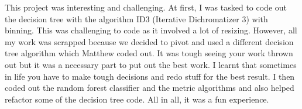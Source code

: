  This project was interesting and challenging. At first, I was tasked to code out the decision tree with the algorithm ID3 (Iterative Dichromatizer 3) with binning. This was challenging to code as it involved a lot of resizing. However, all my work was scrapped because we decided to pivot and used a different decision tree algorithm which Matthew coded out. It was tough seeing your work thrown out but it was a necessary part to put out the best work. I learnt that sometimes in life you have to make tough decisions and redo stuff for the best result. I then coded out the random forest classifier and the metric algorithms and also helped refactor some of the decision tree code. All in all, it was a fun experience.

\begin{figure}[h]
\end{figure}
